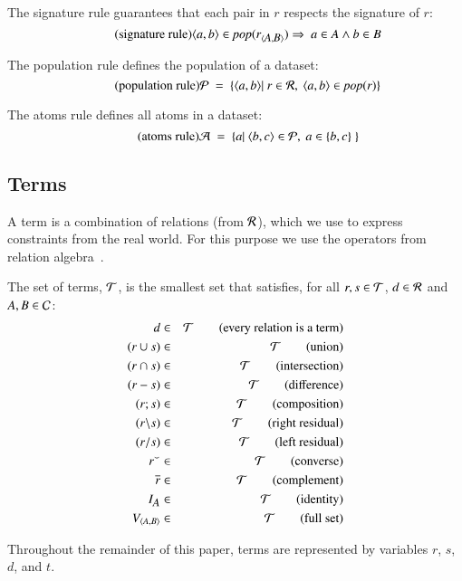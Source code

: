 \documentclass{elsarticle}
\begin{document}
	The signature rule guarantees that each pair in $r$ respects the signature of $r$:
\begin{equation}
	\tag{signature rule}
	\langle{a},{b}\rangle\in\text{\it pop\/}(\text{\it r\/}_{\langle{\text{\it \small A\/}},{\text{\it \small B\/}}\rangle}) \Rightarrow\ a \in A \wedge b \in B \label{typing of relations}
\end{equation}

	The population rule defines the population of a dataset:
\begin{equation}
	\tag{population rule}
	\mathcal{P}\ =\ \{ \langle{a},{b}\rangle|\ r\in\mathcal{R},\ \langle{a},{b}\rangle\in\text{\it pop\/}(r)\} \label{def. population}
\end{equation}

	The atoms rule defines all atoms in a dataset:
\begin{equation}
	\tag{atoms rule}
	\mathcal{A}\ =\ \{ a |\ \langle{b},{c}\rangle\in\mathcal{P},\ a\in\{b,c\}\ \} \label{def atoms}
\end{equation}
\subsection{Terms}
	A term is a combination of relations (from $\mathcal{R}$), which we use to express constraints from the real world.
	For this purpose we use the operators from relation algebra~\cite{BrinkKahlSchmidt1997}.
\begin{definition}[terms]
\label{def:terms}
\item   The set of terms, $\mathcal{T}$, is the smallest set that satisfies, for all $r,s \in \mathcal{T}$, $d\in\mathcal{R}$ and $A,B \in \mathcal{C}$: 
\begin{eqnarray*}
	d&\in&\mathcal{T}         \quad\quad\text{(every relation is a term)}\\
	(r \cup s)&\in&\mathcal{T}\quad\quad\text{(union)}\\
	(r \cap s)&\in&\mathcal{T}\quad\quad\text{(intersection)}\\
	(r-s)&\in&\mathcal{T}     \quad\quad\text{(difference)}\label{def:difference}\\
	(r;s)&\in&\mathcal{T}     \quad\quad\text{(composition)}\\
	(r\backslash s)&\in&\mathcal{T}     \quad\quad\text{(right residual)}\\
	(r\slash s)&\in&\mathcal{T}     \quad\quad\text{(left residual)}\\
	{r}^\smallsmile&\in&\mathcal{T}   \quad\quad\text{(converse)}\\
	\overline{r}&\in&\mathcal{T}   \quad\quad\text{(complement)}\\
	I_{\text{\it \small A\/}}&\in&\mathcal{T} \quad\quad\text{(identity)}\\
	V_{\langle{A},{B}\rangle}&\in&\mathcal{T} \quad\quad\text{(full set)}
\end{eqnarray*}
\end{definition}
	Throughout the remainder of this paper,	terms are represented by variables $r$, $s$, $d$, and $t$.
\end{document}
